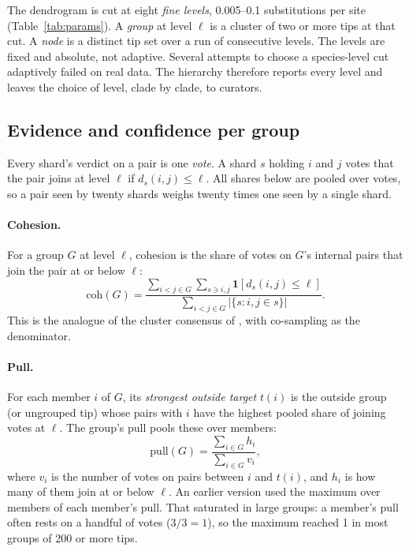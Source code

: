 \documentclass[11pt,a4paper]{article}
\newcommand{\level}{\ell}
\begin{document}
The dendrogram is cut at eight \emph{fine levels}, 0.005--0.1 substitutions per site
(Table~\ref{tab:params}). A \emph{group} at level $\level$ is a cluster of two or more tips at that
cut. A \emph{node} is a distinct tip set over a run of consecutive levels. The levels are fixed and
absolute, not adaptive. Several attempts to choose a species-level cut adaptively failed on real
data. The hierarchy therefore reports every level and leaves the choice of level, clade by clade,
to curators.

\subsection{Evidence and confidence per group}\label{sec:evidence}

Every shard's verdict on a pair is one \emph{vote}. A shard $s$ holding $i$ and $j$ votes that the
pair joins at level $\level$ if $d_s(i,j) \le \level$. All shares below are pooled over votes, so a
pair seen by twenty shards weighs twenty times one seen by a single shard.

\paragraph{Cohesion.} For a group $G$ at level $\level$, cohesion is the share of votes on $G$'s
internal pairs that join the pair at or below $\level$:
\begin{equation}
  \mathrm{coh}(G) = \frac{\sum_{i<j \in G} \sum_{s \ni i,j} \mathbf{1}[d_s(i,j) \le \level]}
                         {\sum_{i<j \in G} |\{ s : i,j \in s\}|}.
\end{equation}
This is the analogue of the cluster consensus of \citet{monti2003consensus}, with co-sampling as
the denominator.

\paragraph{Pull.} For each member $i$ of $G$, its \emph{strongest outside target} $t(i)$ is the
outside group (or ungrouped tip) whose pairs with $i$ have the highest pooled share of joining
votes at $\level$. The group's pull pools these over members:
\begin{equation}
  \mathrm{pull}(G) = \frac{\sum_{i\in G} h_i}{\sum_{i \in G} v_i},
\end{equation}
where $v_i$ is the number of votes on pairs between $i$ and $t(i)$, and $h_i$ is how many of them
join at or below $\level$. An earlier version used the maximum over members of each member's pull.
That saturated in large groups: a member's pull often rests on a handful of votes ($3/3 = 1$), so
the maximum reached 1 in most groups of 200 or more tips.
\end{document}
